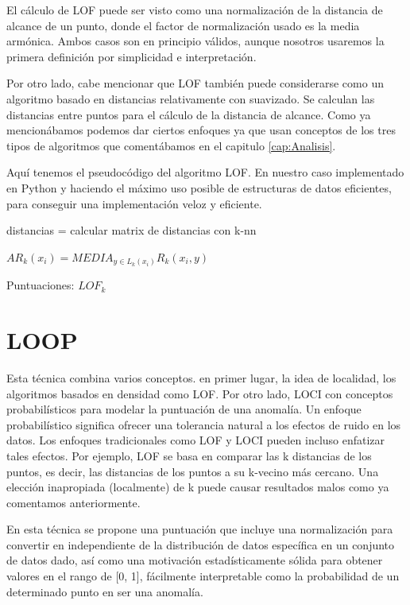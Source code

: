 El cálculo de LOF puede ser visto como una normalización de la distancia
de alcance de un punto, donde el factor de normalización usado es la 
media armónica. Ambos casos son en principio válidos, aunque nosotros usaremos
la primera definición por simplicidad e interpretación.


Por otro lado, cabe mencionar que LOF también puede considerarse como
un algoritmo basado en distancias relativamente con suavizado. Se calculan
las distancias entre puntos para el cálculo de la distancia de alcance.
Como ya mencionábamos podemos dar ciertos enfoques ya que usan conceptos
de los tres tipos de algoritmos que comentábamos en el capitulo 
\ref{cap:Analisis}.

Aquí tenemos el pseudocódigo del algoritmo LOF. En nuestro caso implementado
en Python y haciendo el máximo uso posible de estructuras de datos eficientes,
para conseguir una implementación veloz y eficiente.

\begin{codigo}
    \begin{algorithmic}[1]
    \State \parbox[t]{305pt}{distancias = calcular matrix de distancias con k-nn}
    \State \parbox[t]{305pt}{ $AR_k(x_i) = MEDIA_{y \in L_k(x_i) } R_k(x_i,y)$}
    \EndFor 
    \State \Return Puntuaciones: $LOF_k$
    \EndFunction 
    \end{algorithmic}
\end{codigo}


\section{LOOP}
Esta técnica combina varios conceptos. en primer lugar, la idea de localidad,
los algoritmos basados en densidad como LOF. Por otro lado, LOCI con conceptos
probabilísticos para modelar la puntuación de una anomalía. Un enfoque probabilístico 
significa ofrecer una tolerancia natural a los efectos de ruido en los datos. 
Los enfoques tradicionales como LOF y LOCI pueden incluso enfatizar tales efectos. 
Por ejemplo, LOF se basa en comparar las k distancias de los puntos, es decir, 
las distancias de los puntos a su k-vecino más cercano. Una elección inapropiada 
(localmente) de k puede causar resultados malos como ya comentamos anteriormente.

En esta técnica se propone una puntuación que incluye una normalización para 
convertir en independiente de la distribución de datos específica en un conjunto 
de datos dado, así como una motivación estadísticamente sólida para obtener valores 
en el rango de [0, 1], fácilmente interpretable como la probabilidad de un 
determinado punto en ser una anomalía.

